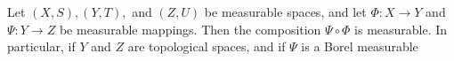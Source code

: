 Let $(X, S), (Y, T),$ and $(Z, U)$ be measurable spaces, and let $\Phi : X \to Y$ and $\Psi : Y \to Z$ be measurable mappings. Then the composition $\Psi \circ \Phi$ is measurable. In particular, if $Y$ and $Z$ are topological spaces, and if $\Psi$ is a Borel measurable

